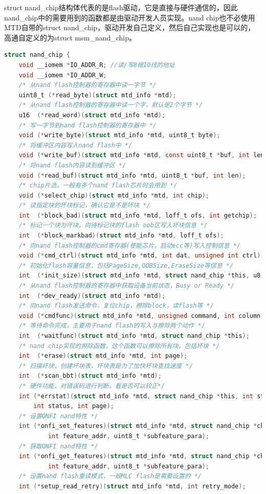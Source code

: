 \clearpage

struct nand\_chip结构体代表的是flash驱动，它是直接与硬件通信的，因此nand\_chip中的需要用到的函数都是由驱动开发人员实现。nand chip也不必使用MTD自带的struct nand\_chip，驱动开发自己定义，然后自己实现也是可以的，高通自定义的为struct msm\_nand\_chip。
\begin{lstlisting}[language=C]
struct nand_chip {
	void __iomem *IO_ADDR_R; //读/写8根IO线的地址
	void __iomem *IO_ADDR_W;
	/* 从nand flash控制器的寄存器中读一字节 */
	uint8_t (*read_byte)(struct mtd_info *mtd);
	/* 从nand flash控制器的寄存器中读一个字，默认是2个字节 */
	u16  (*read_word)(struct mtd_info *mtd); 
	/* 写一字节到nand flash控制器的寄存器中 */
	void (*write_byte)(struct mtd_info *mtd, uint8_t byte);
	/* 将缓冲区内容写入nand flash中 */
	void (*write_buf)(struct mtd_info *mtd, const uint8_t *buf, int len); 
	/* 将nand flash内容读到缓冲区 */
	void (*read_buf)(struct mtd_info *mtd, uint8_t *buf, int len); 
	/* chip片选，一般有多个nand flash芯片时会用到 */
	void (*select_chip)(struct mtd_info *mtd, int chip); 
	/* 读指定块的坏块标记，确认它是不是坏块 */
	int  (*block_bad)(struct mtd_info *mtd, loff_t ofs, int getchip); 
	/* 标记一个块为坏块，向待标记块的flash oob区写入坏块信息 */
	int  (*block_markbad)(struct mtd_info *mtd, loff_t ofs); 
	/* 向nand flash控制器的cmd寄存器(使能芯片，启动ecc等)写入控制信息 */
	void (*cmd_ctrl)(struct mtd_info *mtd, int dat, unsigned int ctrl);
	/* 初始化flash容量信息，包括PageSize,OOBSize,EraseSize等信息 */
	int  (*init_size)(struct mtd_info *mtd, struct nand_chip *this, u8 *id_data);
	/* 从nand flash控制器的寄存器中获取设备当前状态，Busy or Ready */
	int  (*dev_ready)(struct mtd_info *mtd);
	/* 向nand flash发送命令，复位chip，擦除block，读flash等 */
	void (*cmdfunc)(struct mtd_info *mtd, unsigned command, int column, int page_addr);
	/* 等待命令完成，主要用于nand flash的写入与擦除两个动作 */
	int  (*waitfunc)(struct mtd_info *mtd, struct nand_chip *this);
	/* nand chip实现的擦除函数，这个函数可以擦除所有块，包括坏块 */
	int  (*erase)(struct mtd_info *mtd, int page);
	/* 扫描坏块，创建坏块表，坏块表是为了加快坏块查找速度 */
	int  (*scan_bbt)(struct mtd_info *mtd);
	/* 硬件功能，对错误码进行判断，看是否可以较正*/
	int (*errstat)(struct mtd_info *mtd, struct nand_chip *this, int state,
		int status, int page);
	/* 设置ONFI nand特性 */
	int (*onfi_set_features)(struct mtd_info *mtd, struct nand_chip *chip,
			int feature_addr, uint8_t *subfeature_para);
	/* 获取ONFI nand特性 */
	int (*onfi_get_features)(struct mtd_info *mtd, struct nand_chip *chip,
			int feature_addr, uint8_t *subfeature_para);
	/* 设置nand flash重读模式，一般MLC flash是需要设置的 */
	int (*setup_read_retry)(struct mtd_info *mtd, int retry_mode);
	

\end{lstlisting}
